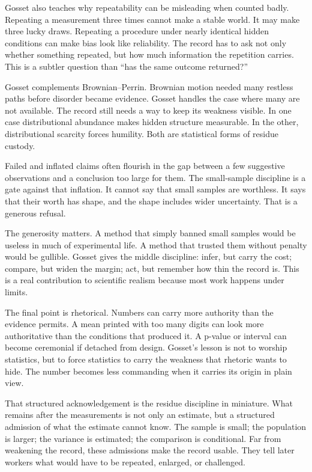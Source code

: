 Gosset also teaches why repeatability can be misleading when counted badly.
Repeating a measurement three times cannot make a stable world. It may make
three lucky draws. Repeating a procedure under nearly identical hidden
conditions can make bias look like reliability. The record has to ask not
only whether something repeated, but how much information the repetition
carries. This is a subtler question than ``has the same outcome
returned?''

Gosset complements Brownian--Perrin. Brownian motion needed many restless
paths before disorder became evidence. Gosset handles the case where many are
not available. The record still needs a way to keep its weakness visible. In
one case distributional abundance makes hidden structure measurable. In the
other, distributional scarcity forces humility. Both are statistical forms of
residue custody.

Failed and inflated claims often flourish in the gap between a few
suggestive observations and a conclusion too large for them. The small-sample
discipline is a gate against that inflation. It cannot say that small samples
are worthless. It says that their worth has shape, and the shape includes
wider uncertainty. That is a generous refusal.

The generosity matters. A method that simply banned small samples would be
useless in much of experimental life. A method that trusted them without
penalty would be gullible. Gosset gives the middle discipline: infer, but
carry the cost; compare, but widen the margin; act, but remember how thin the
record is. This is a real contribution to scientific realism because most
work happens under limits.

The final point is rhetorical. Numbers can carry more authority than the
evidence permits. A mean
printed with too many digits can look more authoritative than the conditions
that produced it. A p-value or interval can become ceremonial if detached
from design. Gosset's lesson is not to worship statistics, but to force
statistics to carry the weakness that rhetoric wants to hide. The number
becomes less commanding when it carries its origin in plain view.

That structured acknowledgement is the residue discipline in miniature. What
remains after the measurements is not only an estimate, but a structured
admission of what the estimate cannot know. The sample is small; the population is larger;
the variance is estimated; the comparison is conditional. Far from weakening
the record, these admissions make the record usable. They tell later workers
what would have to be repeated, enlarged, or challenged.

